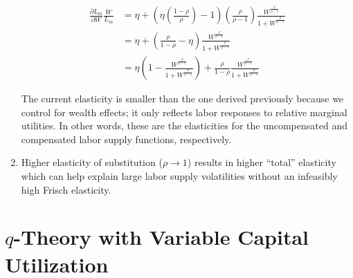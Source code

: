 \documentclass[11pt]{article}
\begin{document}
\begin{enumerate}
        	\begin{align*}
        	\frac{\partial L_m}{\partial W} \frac{W}{L_m} &= \eta + \left( \eta \left( \frac{1-\rho}{\rho} \right) -1  \right) \left( \frac{\rho}{\rho-1} \right) \frac{W^{\frac{\rho}{\rho-1}}}{1 + W^{\frac{\rho}{\rho-1}}} \\
        	& = \eta + \left(  \frac{\rho}{1-\rho} - \eta \right) \frac{W^{\frac{\rho}{\rho-1}}}{1 + W^{\frac{\rho}{\rho-1}}} \\
            & = \eta \left ( 1 - \frac{W^{\frac{\rho}{\rho-1}}}{1 + W^{\frac{\rho}{\rho-1}}} \right ) + \frac{\rho}{1-\rho} \frac{W^{\frac{\rho}{\rho-1}}}{1 + W^{\frac{\rho}{\rho-1}}}
        	\end{align*}

        The current elasticity is smaller than the one derived previously because we control for wealth effects; it only reflects labor responses to relative marginal utilities. In other words, these are the elasticities for the uncompensated and compensated labor supply functions, respectively.

        \item Higher elasticity of substitution ($\rho \to 1$) results in higher ``total'' elasticity which can help explain large labor supply volatilities without an infeasibly high Frisch elasticity.

    \end{enumerate}

\section{$q$-Theory with Variable Capital Utilization}
\end{document}
